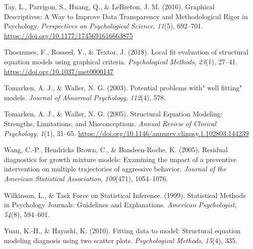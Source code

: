\documentclass[
  english,
  doc]{apa6}
\newlength{\cslhangindent}
\newenvironment{cslreferences}%
  {\setlength{\parindent}{0pt}%
  \everypar{\setlength{\hangindent}{\cslhangindent}}\ignorespaces}%
  {\par}
\begin{document}
\begin{cslreferences}
\leavevmode\hypertarget{ref-Tay2016a}{}%
Tay, L., Parrigon, S., Huang, Q., \& LeBreton, J. M. (2016). Graphical Descriptives: A Way to Improve Data Transparency and Methodological Rigor in Psychology. \emph{Perspectives on Psychological Science}, \emph{11}(5), 692--701. \url{https://doi.org/10.1177/1745691616663875}

\leavevmode\hypertarget{ref-Thoemmes2018}{}%
Thoemmes, F., Rosseel, Y., \& Textor, J. (2018). Local fit evaluation of structural equation models using graphical criteria. \emph{Psychological Methods}, \emph{23}(1), 27--41. \url{https://doi.org/10.1037/met0000147}

\leavevmode\hypertarget{ref-tomarken2003potential}{}%
Tomarken, A. J., \& Waller, N. G. (2003). Potential problems with" well fitting" models. \emph{Journal of Abnormal Psychology}, \emph{112}(4), 578.

\leavevmode\hypertarget{ref-Tomarken2005}{}%
Tomarken, A. J., \& Waller, N. G. (2005). Structural Equation Modeling: Strengths, Limitations, and Misconceptions. \emph{Annual Review of Clinical Psychology}, \emph{1}(1), 31--65. \url{https://doi.org/10.1146/annurev.clinpsy.1.102803.144239}

\leavevmode\hypertarget{ref-wang2005residual}{}%
Wang, C.-P., Hendricks Brown, C., \& Bandeen-Roche, K. (2005). Residual diagnostics for growth mixture models: Examining the impact of a preventive intervention on multiple trajectories of aggressive behavior. \emph{Journal of the American Statistical Association}, \emph{100}(471), 1054--1076.

\leavevmode\hypertarget{ref-Wilkinson1999a}{}%
Wilkinson, L., \& Task Force on Statistical Inference. (1999). Statistical Methods in Psychology Journals: Guidelines and Explanations. \emph{American Psychologist}, \emph{54}(8), 594--601.

\leavevmode\hypertarget{ref-yuan2010fitting}{}%
Yuan, K.-H., \& Hayashi, K. (2010). Fitting data to model: Structural equation modeling diagnosis using two scatter plots. \emph{Psychological Methods}, \emph{15}(4), 335.
\end{cslreferences}
\end{document}
